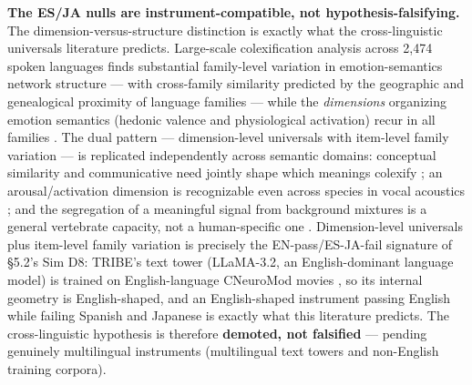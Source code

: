 \documentclass[11pt,twocolumn]{article}
\theoremstyle{plain}
\begin{document}
\textbf{The ES/JA nulls are instrument-compatible, not hypothesis-falsifying.} The dimension-versus-structure distinction is exactly what the cross-linguistic universals literature predicts. Large-scale colexification analysis across 2{,}474 spoken languages finds substantial family-level variation in emotion-semantics network structure --- with cross-family similarity predicted by the geographic and genealogical proximity of language families --- while the \textit{dimensions} organizing emotion semantics (hedonic valence and physiological activation) recur in all families \citep{jackson2019}. The dual pattern --- dimension-level universals with item-level family variation --- is replicated independently across semantic domains: conceptual similarity and communicative need jointly shape which meanings colexify \citep{xu2020,karjus2021}; an arousal/activation dimension is recognizable even across species in vocal acoustics \citep{filippi2017}; and the segregation of a meaningful signal from background mixtures is a general vertebrate capacity, not a human-specific one \citep{bee2008}. Dimension-level universals plus item-level family variation is precisely the EN-pass/ES-JA-fail signature of \S{}5.2's Sim D8: TRIBE's text tower (LLaMA-3.2, an English-dominant language model) is trained on English-language CNeuroMod movies \citep{dascoli2025}, so its internal geometry is English-shaped, and an English-shaped instrument passing English while failing Spanish and Japanese is exactly what this literature predicts. The cross-linguistic hypothesis is therefore \textbf{demoted, not falsified} --- pending genuinely multilingual instruments (multilingual text towers and non-English training corpora).
\end{document}
